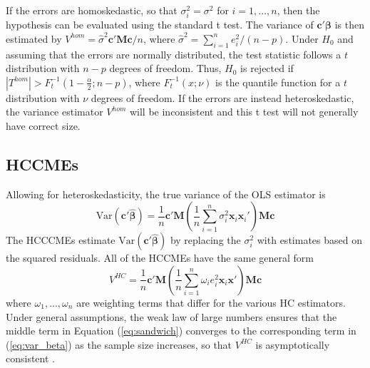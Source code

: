 \documentclass[12pt]{article}\usepackage[]{graphicx}\usepackage[]{color}
\newcommand{\Var}{\text{Var}}
\newcommand{\bm}{\mathbf}
\newcommand{\bs}{\boldsymbol}
\begin{document}
If the errors are homoskedastic, so that $\sigma_i^2 = \sigma^2$ for $i = 1,...,n$, then the hypothesis can be evaluated using the standard t test. 
The variance of $\bm{c}'\bs\beta$ is then estimated by $V^{hom} = \hat\sigma^2 \bm{c}'\bm{M}\bm{c} / n$, where $\hat\sigma^2 = \sum_{i=1}^n e_i^2 / (n - p)$. 
Under $H_0$ and assuming that the errors are normally distributed, the test statistic follows a $t$ distribution with $n - p$ degrees of freedom. 
Thus, $H_0$ is rejected if $\left|T^{hom}\right| > F_t^{-1}\left(1 - \frac{\alpha}{2}; n - p\right)$, where $F_t^{-1}(x; \nu)$ is the quantile function for a $t$ distribution with $\nu$ degrees of freedom. 
If the errors are instead heteroskedastic, the variance estimator $V^{hom}$ will be inconsistent and this t test will not generally have correct size. 

\subsection{HCCMEs}

Allowing for heteroskedasticity, the true variance of the OLS estimator is 
\begin{equation}
\label{eq:var_beta}
\Var\left(\bm{c}'\bs{\hat\beta}\right) = \frac{1}{n} \bm{c}'\bm{M} \left(\frac{1}{n}\sum_{i=1}^n \sigma_i^2 \bm{x}_i\bm{x}_i'\right) \bm{M}\bm{c}
\end{equation}
The HCCCMEs estimate $\Var\left(\bm{c}'\bs{\hat\beta}\right)$ by replacing the $\sigma_i^2$ with estimates based on the squared residuals. All of the HCCMEs have the same general form  
\begin{equation}
\label{eq:sandwich}
V^{HC} = \frac{1}{n} \bm{c}'\bm{M} \left(\frac{1}{n}\sum_{i=1}^n \omega_i e_i^2 \bm{x}_i\bm{x}'\right)\bm{M} \bm{c}
\end{equation}
where $\omega_{1},...,\omega_{n}$ are weighting terms that differ for the various HC estimators. 
Under general assumptions, the weak law of large numbers ensures that the middle term in Equation (\ref{eq:sandwich}) converges to the corresponding term in (\ref{eq:var_beta}) as the sample size increases, so that $V^{HC}$ is asymptotically consistent \citep{White1980heteroskedasticity}.
\end{document}
